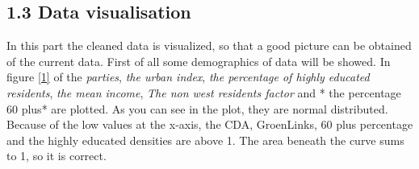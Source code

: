\documentclass[11pt,]{article}
\newenvironment{Shaded}{\begin{snugshade}}{\end{snugshade}}
\newcommand{\KeywordTok}[1]{\textcolor[rgb]{0.13,0.29,0.53}{\textbf{#1}}}
\newcommand{\DecValTok}[1]{\textcolor[rgb]{0.00,0.00,0.81}{#1}}
\newcommand{\FloatTok}[1]{\textcolor[rgb]{0.00,0.00,0.81}{#1}}
\newcommand{\StringTok}[1]{\textcolor[rgb]{0.31,0.60,0.02}{#1}}
\newcommand{\OperatorTok}[1]{\textcolor[rgb]{0.81,0.36,0.00}{\textbf{#1}}}
\newcommand{\NormalTok}[1]{#1}
\begin{document}
\begin{Shaded}
\end{Shaded}

\subsection{1.3 Data visualisation}\label{data-visualisation}

In this part the cleaned data is visualized, so that a good picture can
be obtained of the current data. First of all some demographics of data
will be showed. In figure \ref{1} of the \emph{parties}, \emph{the urban
index}, \emph{the percentage of highly educated residents}, \emph{the
mean income}, \emph{The non west residents factor} and * the percentage
60 plus* are plotted. As you can see in the plot, they are normal
distributed. Because of the low values at the x-axis, the CDA,
GroenLinks, 60 plus percentage and the highly educated densities are
above 1. The area beneath the curve sums to 1, so it is correct.
\end{document}
